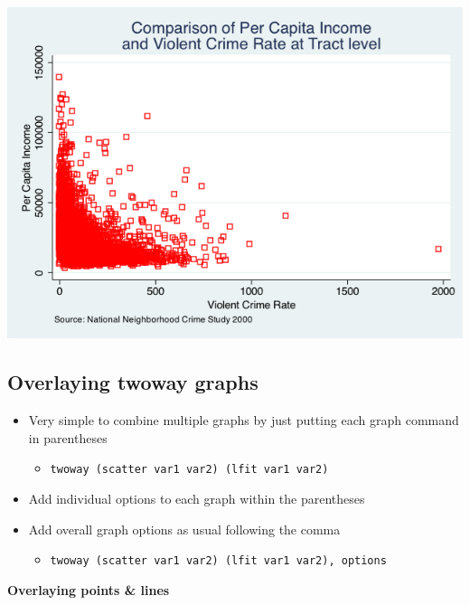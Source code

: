 \documentclass[
]{book}
\providecommand{\tightlist}{%
  \setlength{\itemsep}{0pt}\setlength{\parskip}{0pt}}
\begin{document}
\includegraphics{Stata/StataGraphics/images/msymbol_mcolor.png}

\hypertarget{overlaying-twoway-graphs}{%
\subsection{Overlaying twoway graphs}\label{overlaying-twoway-graphs}}

\begin{itemize}
\tightlist
\item
  Very simple to combine multiple graphs by just putting each graph command in parentheses

  \begin{itemize}
  \tightlist
  \item
    \texttt{twoway\ (scatter\ var1\ var2)\ (lfit\ var1\ var2)}
  \end{itemize}
\item
  Add individual options to each graph within the parentheses
\item
  Add overall graph options as usual following the comma

  \begin{itemize}
  \tightlist
  \item
    \texttt{twoway\ (scatter\ var1\ var2)\ (lfit\ var1\ var2),\ options}
  \end{itemize}
\end{itemize}

\textbf{Overlaying points \& lines}
\end{document}
